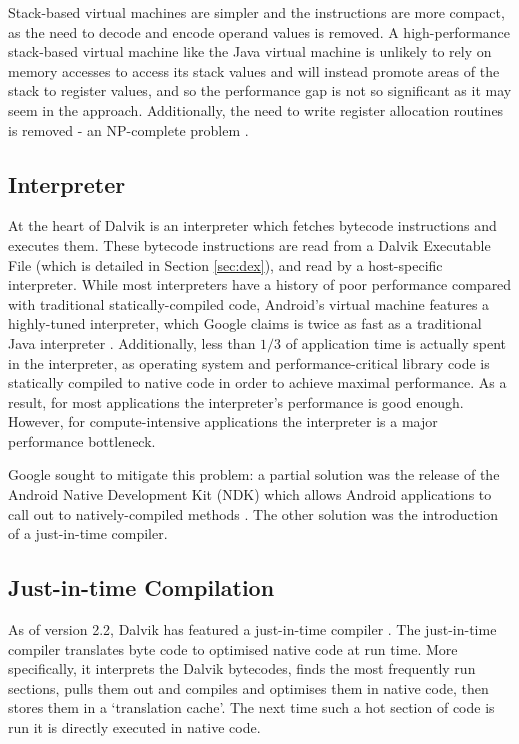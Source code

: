 Stack-based virtual machines are simpler and the instructions are more compact, as the need to decode and encode operand values is removed. A high-performance stack-based virtual machine like the Java virtual machine is unlikely to rely on memory accesses to access its stack values and will instead promote areas of the stack to register values, and so the performance gap is not so significant as it may seem in the \naive approach. Additionally, the need to write register allocation routines is removed - an NP-complete problem \cite{chaitin82}.

\subsection*{Interpreter}

At the heart of Dalvik is an interpreter which fetches bytecode instructions and executes them. These bytecode instructions are read from a Dalvik Executable File (which is detailed in Section \ref{sec:dex}), and read by a host-specific interpreter. While most interpreters have a history of poor performance compared with traditional statically-compiled code, Android's virtual machine features a highly-tuned interpreter, which Google claims is twice as fast as a traditional Java interpreter \cite{android_22}. Additionally, less than $1/3$ of application time is actually spent in the interpreter, as operating system and performance-critical library code is statically compiled to native code in order to achieve maximal performance. As a result, for most applications the interpreter's performance is good enough. However, for compute-intensive applications the interpreter is a major performance bottleneck.

Google sought to mitigate this problem: a partial solution was the release of the Android Native Development Kit (NDK) which allows Android applications to call out to natively-compiled methods \cite{android_22}. The other solution was the introduction of a just-in-time compiler.

\subsection*{Just-in-time Compilation}

As of version 2.2, Dalvik has featured a just-in-time compiler \cite{android_22}. The just-in-time compiler translates byte code to optimised native code at run time. More specifically, it interprets the Dalvik bytecodes, finds the most frequently run sections, pulls them out and compiles and optimises them in native code, then stores them in a `translation cache'. The next time such a hot section of code is run it is directly executed in native code.

